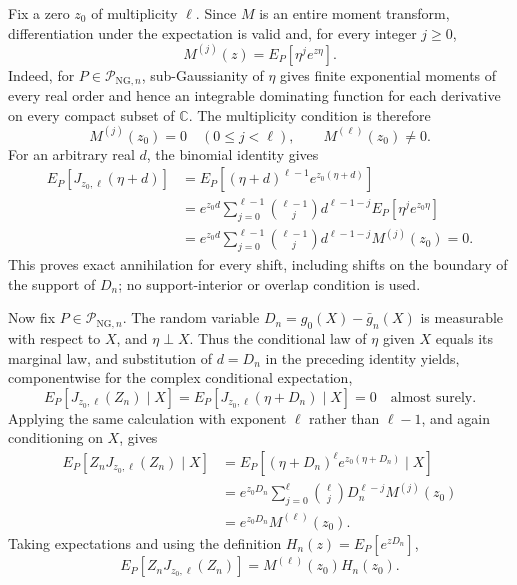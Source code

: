 Fix a zero \(z_0\) of multiplicity \(\ell\).  Since \(M\) is an entire moment transform, differentiation under the expectation is valid and, for every integer \(j\geq 0\),
\[
M^{(j)}(z)=E_P\!\left[\eta^j e^{z\eta}\right].
\]
Indeed, for \(P\in\mathcal P_{\mathrm{NG},n}\), sub-Gaussianity of \(\eta\) gives finite exponential moments of every real order and hence an integrable dominating function for each derivative on every compact subset of \(\mathbb C\).  The multiplicity condition is therefore
\[
M^{(j)}(z_0)=0\quad(0\leq j<\ell),
\qquad
M^{(\ell)}(z_0)\neq 0.
\]
For an arbitrary real \(d\), the binomial identity gives
\[
\begin{aligned}
E_P\!\left[J_{z_0,\ell}(\eta+d)\right]
&=E_P\!\left[(\eta+d)^{\ell-1}e^{z_0(\eta+d)}\right]\\
&=e^{z_0d}\sum_{j=0}^{\ell-1}
  {\ell-1\choose j}d^{\ell-1-j}
  E_P\!\left[\eta^j e^{z_0\eta}\right]\\
&=e^{z_0d}\sum_{j=0}^{\ell-1}
  {\ell-1\choose j}d^{\ell-1-j}M^{(j)}(z_0)
=0.
\end{aligned}
\]
This proves exact annihilation for every shift, including shifts on the boundary of the support of \(D_n\); no support-interior or overlap condition is used.

Now fix \(P\in\mathcal P_{\mathrm{NG},n}\).  The random variable \(D_n=g_0(X)-\bar g_n(X)\) is measurable with respect to \(X\), and \(\eta\perp X\).  Thus the conditional law of \(\eta\) given \(X\) equals its marginal law, and substitution of \(d=D_n\) in the preceding identity yields, componentwise for the complex conditional expectation,
\[
E_P\!\left[J_{z_0,\ell}(Z_n)\mid X\right]
=E_P\!\left[J_{z_0,\ell}(\eta+D_n)\mid X\right]
=0
\quad\text{almost surely}.
\]
Applying the same calculation with exponent \(\ell\) rather than \(\ell-1\), and again conditioning on \(X\), gives
\[
\begin{aligned}
E_P\!\left[Z_nJ_{z_0,\ell}(Z_n)\mid X\right]
&=E_P\!\left[(\eta+D_n)^\ell e^{z_0(\eta+D_n)}\mid X\right]\\
&=e^{z_0D_n}\sum_{j=0}^{\ell}{\ell\choose j}
  D_n^{\ell-j}M^{(j)}(z_0)\\
&=e^{z_0D_n}M^{(\ell)}(z_0).
\end{aligned}
\]
Taking expectations and using the definition \(H_n(z)=E_P[e^{zD_n}]\),
\[
E_P\!\left[Z_nJ_{z_0,\ell}(Z_n)\right]
=M^{(\ell)}(z_0)H_n(z_0).
\]

